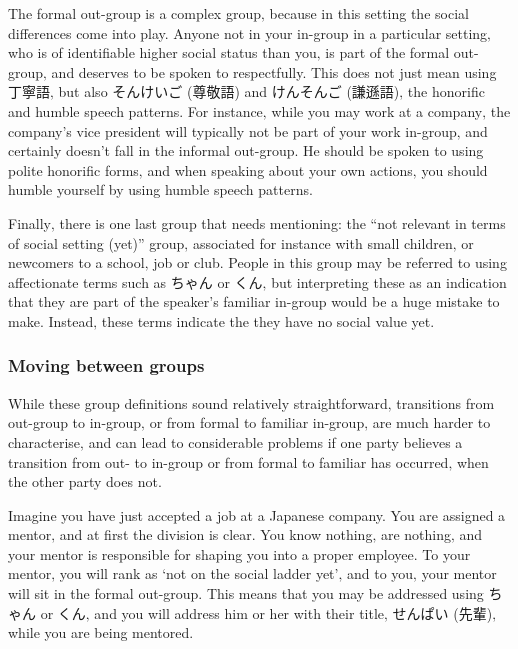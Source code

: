 \documentclass[11pt, b5paper, twoside, openright, onecolumn]{book}
\makeatletter
\newcommand*{\rubystack}[2]{{\relscale{0.5}%
  \begin{tabular}[b]{@{}c@{}}%
    {#1}\\%
   {\textscale{2}{#2}}%
  \end{tabular}}%
}
\DeclareRobustCommand*{\ruby}[2]{%
  \mbox{%
    \setlength{\parskip}{0ex}%
    \BeginAccSupp{method=pdfstringdef,ActualText={#1}}%
      \rubystack{\phantom{#2}}{#1}%
      \llap{%
        \rubystack{#2}{\phantom{#1}}%
      }%
    \EndAccSupp{}%
  }%
}
\renewcommand*{\ruby}[2]{#2 (#1)}%
\makeatother
\begin{document}
The formal out-group is a complex group‚ because in this setting the social differences come into play. Anyone not in your in-group in a particular setting‚ who is of identifiable higher social status than you‚ is part of the formal out-group‚ and deserves to be spoken to respectfully. This does not just mean using 丁寧語‚ but also \ruby{尊敬語}{そんけいご} and \ruby{謙遜語}{けんそんご}‚ the honorific and humble speech patterns. For instance‚ while you may work at a company‚ the company’s vice president will typically not be part of your work in-group‚ and certainly doesn’t fall in the informal out-group. He should be spoken to using polite honorific forms‚ and when speaking about your own actions‚ you should humble yourself by using humble speech patterns.

Finally‚ there is one last group that needs mentioning: the “not relevant in terms of social setting (yet)” group‚ associated for instance with small children‚ or newcomers to a school‚ job or club. People in this group may be referred to using affectionate terms such as ちゃん or くん‚ but interpreting these as an indication that they are part of the speaker’s familiar in-group would be a huge mistake to make. Instead‚ these terms indicate the they have no social value yet.

\subsubsection{Moving between groups}

While these group definitions sound relatively straightforward‚ transitions from out-group to in-group‚ or from formal to familiar in-group‚ are much harder to characterise‚ and can lead to considerable problems if one party believes a transition from out- to in-group or from formal to familiar has occurred‚ when the other party does not.

Imagine you have just accepted a job at a Japanese company. You are assigned a mentor‚ and at first the division is clear. You know nothing‚ are nothing‚ and your mentor is responsible for shaping you into a proper employee. To your mentor‚ you will rank as ‘not on the social ladder yet’‚ and to you‚ your mentor will sit in the formal out-group. This means that you may be addressed using ちゃん or くん‚ and you will address him or her with their title‚ \ruby{先輩}{せんぱい}‚ while you are being mentored.
\end{document}
